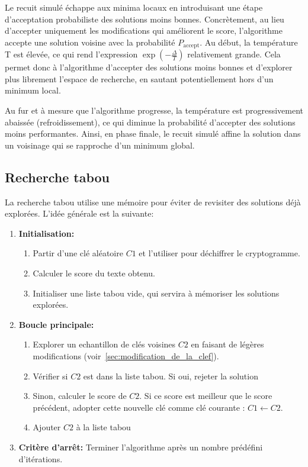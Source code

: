 \documentclass[a4paper]{article}
\begin{document}
Le recuit simulé échappe aux minima locaux en introduisant une étape d'acceptation probabiliste des solutions moins bonnes. Concrètement, au lieu d'accepter uniquement les modifications qui améliorent le score, l'algorithme accepte une solution voisine avec la probabilité $P_{\text{accept}}$.
Au début, la température T est élevée, ce qui rend l'expression $\exp\left(-\frac{\Delta}{T}\right)$ relativement grande. Cela permet donc à l'algorithme d'accepter des solutions moins bonnes et d'explorer plus librement l'espace de recherche, en sautant potentiellement hors d'un minimum local.

Au fur et à mesure que l'algorithme progresse, la température est progressivement abaissée (refroidissement), ce qui diminue la probabilité d'accepter des solutions moins performantes. Ainsi, en phase finale, le recuit simulé affine la solution dans un voisinage qui se rapproche d'un minimum global.


\subsection{Recherche tabou}


La recherche tabou utilise une mémoire pour éviter de revisiter des solutions déjà explorées. L'idée générale est la suivante:

\begin{enumerate}
    \item \textbf{Initialisation:}
    \begin{enumerate}
        \item Partir d'une clé aléatoire $C1$ et l'utiliser pour déchiffrer le cryptogramme.
        \item Calculer le score du texte obtenu.
        \item Initialiser une liste tabou vide, qui servira à mémoriser les solutions explorées.
    \end{enumerate}
    \item \textbf{Boucle principale:}
    \begin{enumerate}[label= (\alph*)]
        \item Explorer un echantillon de clés voisines $C2$ en faisant de légères modifications (voir~\ref{sec:modification_de_la_clef}).
        \item Vérifier si $C2$ est dans la liste tabou. Si oui, rejeter la solution
        \item Sinon, calculer le score de $C2$. Si ce score est meilleur que le score précédent, adopter cette nouvelle clé comme clé courante : $C1 \leftarrow C2$.
        \item Ajouter $C2$ à la liste tabou 
    \end{enumerate}
    \item \textbf{Critère d'arrêt:} Terminer l'algorithme après un nombre prédéfini d'itérations.
\end{enumerate}
\end{document}
